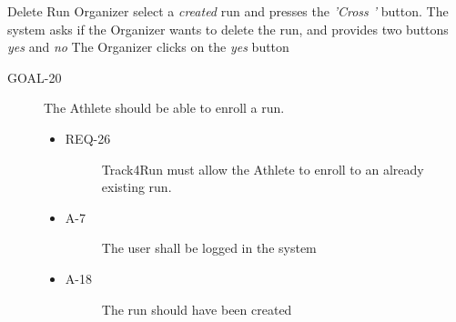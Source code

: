 \documentclass[a4paper]{article}
\newcommand{\requirement}{\ding{229}}%
\begin{document}
        \begin{usecase}{Delete Run}
              {Organizer select a \textit{created} run and presses the \textit{'Cross '} button.}
              {The system asks if the Organizer wants to delete the run, and provides two buttons \textit{yes} and \textit{no}}
              {The Organizer clicks on the \textit{yes} button}
        \end{usecase}
        
       \begin{description}
        	\item[GOAL-20] The Athlete should be able to enroll a run.
            	\begin{itemize}
            	    \item[\requirement]
                	\begin{description}
                	\item[REQ-26] Track4Run must allow the Athlete to enroll to an already existing run.
                	\end{description}
                	\item
                	\begin{description}
                	\item[A-7] The user shall be logged in the system         \end{description}
                	\item
                	\begin{description}
                	\item[A-18] The run should have been created  
                	\end{description}
                	\end{itemize}
        \end{description}
            
\end{document}
